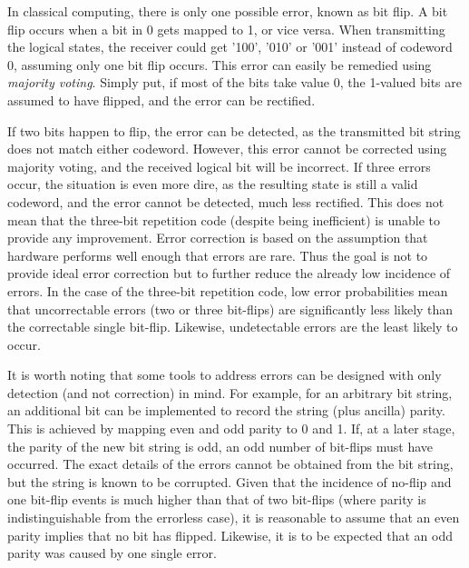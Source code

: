 In classical computing, there is only one possible error, known as bit flip. A bit flip occurs when a bit in 0 gets mapped to 1, or vice versa. When transmitting the logical states, the receiver could get '100', '010' or '001' instead of codeword 0, assuming only one bit flip occurs. This error can easily be remedied using \textit{majority voting}. Simply put, if most of the bits take value 0, the 1-valued bits are assumed to have flipped, and the error can be rectified. 

If two bits happen to flip, the error can be detected, as the transmitted bit string does not match either codeword. However, this error cannot be corrected using majority voting, and the received logical bit will be incorrect. If three errors occur, the situation is even more dire, as the resulting state is still a valid codeword, and the error cannot be detected, much less rectified. This does not mean that the three-bit repetition code (despite being inefficient) is unable to provide any improvement. Error correction is based on the assumption that hardware performs well enough that errors are rare. Thus the goal is not to provide ideal error correction but to further reduce the already low incidence of errors. In the case of the three-bit repetition code, low error probabilities mean that uncorrectable errors (two or three bit-flips) are significantly less likely than the correctable single bit-flip. Likewise, undetectable errors are the least likely to occur. 

It is worth noting that some tools to address errors can be designed with only detection (and not correction) in mind. For example, for an arbitrary bit string, an additional bit can be implemented to record the string (plus ancilla) parity. This is achieved by mapping even and odd parity to 0 and 1. If, at a later stage, the parity of the new bit string is odd, an odd number of bit-flips must have occurred. The exact details of the errors cannot be obtained from the bit string, but the string is known to be corrupted. Given that the incidence of no-flip and one bit-flip events is much higher than that of two bit-flips (where parity is indistinguishable from the errorless case), it is reasonable to assume that an even parity implies that no bit has flipped. Likewise, it is to be expected that an odd parity was caused by one single error.

